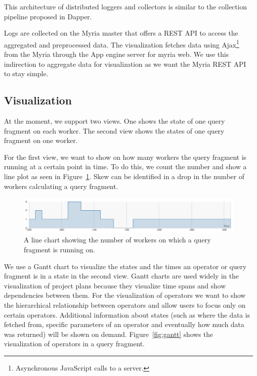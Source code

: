 \documentclass[11pt]{scrartcl}
\begin{document}
This architecture of distributed loggers and collectors is similar to the collection pipeline proposed in Dapper\cite{sigelman2010dapper}.

Logs are collected on the Myria master that offers a REST API to access the aggregated and preprocessed data. The visualization fetches data using Ajax\footnote{Asynchronous JavaScript calls to a server.} from the Myria through the App engine server for myria web. We use this indirection to aggregate data for visualization as we want the Myria REST API to stay simple.


\subsection{Visualization}
\label{sec:visualization}

At the moment, we support two views. One shows the state of one query fragment on each worker. The second view shows the states of one query fragment on one worker.

For the first view, we want to show on how many workers the query fragment is running at a certain point in time. To do this, we count the number and show a line plot as seen in Figure~\ref{fig:line}. Skew can be identified in a drop in the number of workers calculating a query fragment.

\begin{figure}[h]
  \begin{center}
    \includegraphics[width=1\textwidth]{line.png}
  \end{center}
  \caption{A line chart showing the number of workers on which a query fragment is running on.}
  \label{fig:line}
\end{figure}

We use a Gantt chart to visualize the states and the times an operator or query fragment is in a state in the second view. Gantt charts are used widely in the visualization of project plans because they visualize time spans and show dependencies between them. For the visualization of operators we want to show the hierarchical relationship between operators and allow users to focus only on certain operators. Additional information about states (such as where the data is fetched from, specific parameters of an operator and eventually how much data was returned) will be shown on demand. Figure~\ref{fig:gantt} shows the visualization of operators in a query fragment.
\end{document}
